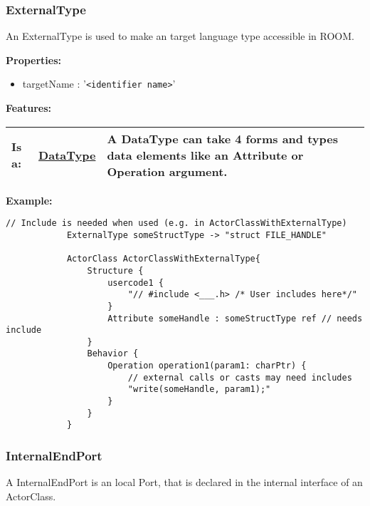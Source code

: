 	\subsubsection{ExternalType}
		\hypertarget{ref:ExternalType}{}
		
		An ExternalType is used to make an target language type accessible in ROOM.
		
		
		\textbf{Properties:}
		\begin{itemize}
		\item targetName : '\verb|<identifier name>|'
		\end{itemize}
		
		\begingroup
		\textbf{Features:}
		\renewcommand{\arraystretch}{1.8} %
		\begin{longtable}{l|l p{}}
			\hline
		Is a: & \tabitem \hyperlink{ref:DataType}{DataType}  & A DataType can take 4 forms and types data elements like an Attribute or Operation argument.\\
		\hline
		\end{longtable}
		\endgroup
		
		
		\textbf{Example:}
		
			\begin{lstlisting}[language=ROOM]
			// Include is needed when used (e.g. in ActorClassWithExternalType)
			ExternalType someStructType -> "struct FILE_HANDLE"
			
			ActorClass ActorClassWithExternalType{
				Structure {
					usercode1 {
						"// #include <___.h> /* User includes here*/"
					}
					Attribute someHandle : someStructType ref // needs include
				}
				Behavior {
					Operation operation1(param1: charPtr) {
						// external calls or casts may need includes
						"write(someHandle, param1);"
					}
				}
			}
			\end{lstlisting}
	
	\vspace{\baselineskip}
	\vspace{\baselineskip}
	\vspace{\baselineskip}
	
	\subsubsection{InternalEndPort}
		\hypertarget{ref:InternalEndPort}{}
		
		A InternalEndPort is an local Port, that is declared in the internal interface of an ActorClass.
		
